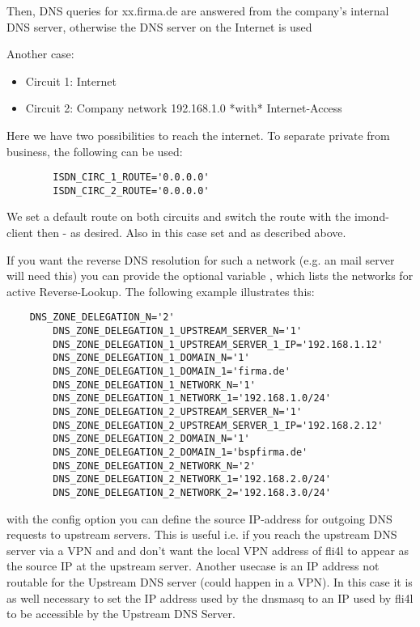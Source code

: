 \begin{description}
{      Then, DNS queries for xx.firma.de are answered from the company's internal
      DNS server, otherwise the DNS server on the Internet is used

      Another case:
      \begin{itemize}
      \item Circuit 1: Internet
      \item Circuit 2: Company network 192.168.1.0 *with* Internet-Access
      \end{itemize}

      Here we have two possibilities to reach the internet. To separate private from business,
      the following can be used:

\begin{example}
\begin{verbatim}
        ISDN_CIRC_1_ROUTE='0.0.0.0'
        ISDN_CIRC_2_ROUTE='0.0.0.0'
\end{verbatim}
\end{example}

      We set a default route on both circuits and switch
      the route with the imond-client then - as desired.
      Also in this case set  and 
      as described above.}

      If you want the reverse DNS resolution for such a network (e.g. an mail server will
      need this) you can provide the optional variable ,
      which lists the networks for active Reverse-Lookup.
      The following example illustrates this:

\begin{example}
\begin{verbatim}
    DNS_ZONE_DELEGATION_N='2'
        DNS_ZONE_DELEGATION_1_UPSTREAM_SERVER_N='1'
        DNS_ZONE_DELEGATION_1_UPSTREAM_SERVER_1_IP='192.168.1.12'
        DNS_ZONE_DELEGATION_1_DOMAIN_N='1'
        DNS_ZONE_DELEGATION_1_DOMAIN_1='firma.de'
        DNS_ZONE_DELEGATION_1_NETWORK_N='1'
        DNS_ZONE_DELEGATION_1_NETWORK_1='192.168.1.0/24'
        DNS_ZONE_DELEGATION_2_UPSTREAM_SERVER_N='1'
        DNS_ZONE_DELEGATION_2_UPSTREAM_SERVER_1_IP='192.168.2.12'
        DNS_ZONE_DELEGATION_2_DOMAIN_N='1'
        DNS_ZONE_DELEGATION_2_DOMAIN_1='bspfirma.de'
        DNS_ZONE_DELEGATION_2_NETWORK_N='2'
        DNS_ZONE_DELEGATION_2_NETWORK_1='192.168.2.0/24'
        DNS_ZONE_DELEGATION_2_NETWORK_2='192.168.3.0/24'
\end{verbatim}
\end{example}
      with the config option 
      you can define the source IP-address for outgoing DNS requests to upstream servers.
      This is useful i.e. if you reach the upstream DNS server via a VPN and and don't
      want the local VPN address of fli4l to appear as the source IP at the upstream
      server. Another usecase is an IP address not routable for the Upstream DNS server
      (could happen in a VPN). In this case it is as well necessary to set the IP address
      used by the dnsmasq to an IP used by fli4l to be accessible by the Upstream DNS Server.


\end{description}
